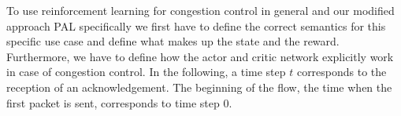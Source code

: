 \documentclass[newfonts=false,format=sigconf,10pt,letterpaper]{acmart}
\newcommand\note[2]{{\color{#1}#2}}
\newcommand\todo[1]{{\note{red}{TODO: #1}}}
\begin{document}

To use reinforcement learning for congestion control in general and our modified approach PAL specifically we first have to define the correct semantics for this specific use case and define what makes up the state and the reward. Furthermore, we have to define how the actor and critic network explicitly work in case of congestion control. In the following, a time step $t$ corresponds to the reception of an acknowledgement. The beginning of the flow, the time when the first packet is sent, corresponds to time step $0$.
\end{document}
